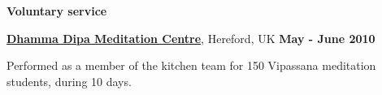 \halfblankline

\textbf{Voluntary service}
\begin{outerlist}

\item[] \href{http://www.dipa.dhamma.org/}{\textbf{Dhamma Dipa Meditation
Centre}}, Hereford, UK%
        \hfill \textbf{May - June 2010}
\begin{innerlist}
\item Performed as a member of the kitchen team for 150 Vipassana meditation
students, during 10 days.
\end{innerlist}
\end{outerlist}

% 

% 
% 
% 

